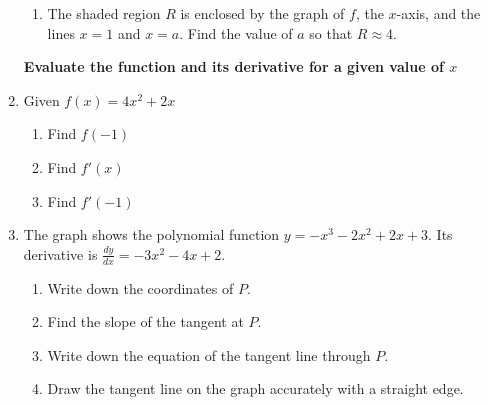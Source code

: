 \documentclass[12pt, twoside]{article}
\begin{document}
\begin{enumerate}
\begin{enumerate}
    \item The shaded region $R$ is enclosed by the graph of $f$, the $x$-axis, and the lines $x=1$ and $x=a$. Find the value of $a$ so that $R \approx 4$.
  \end{enumerate}

\newpage


\textbf{Evaluate the function and its derivative for a given value of $x$}
\item Given $f(x)=4x^2+2x$
\begin{enumerate}[itemsep=2cm]
    \item Find $f(-1)$
    \item Find $f'(x)$
    \item Find $f'(-1)$
\end{enumerate} \vspace{2cm}

\newpage
\item The graph shows the polynomial function $\displaystyle y=-x^3-2x^2+2x+3$. Its derivative is $\displaystyle \frac{dy}{dx}=-3x^2-4x+2$. 
\begin{multicols}{2}
    \begin{enumerate}
        \item Write down the coordinates of $P$. \vspace{1cm}
        \item Find the slope of the tangent at $P$. \vspace{2cm}
        \item Write down the equation of the tangent line through $P$. \vspace{1.5cm}
        \item Draw the tangent line on the graph accurately with a straight edge.
    \end{enumerate}
        \begin{center}
    \end{center}
\end{multicols}


\end{enumerate}
\end{document}
